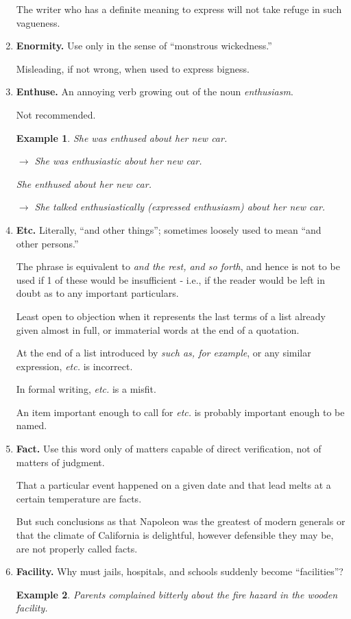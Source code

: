 \documentclass{article}
\newtheorem{example}{Example}
\begin{document}
\begin{enumerate}
	The writer who has a definite meaning to express will not take refuge in such vagueness.
	\item {\bf Enormity.} Use only in the sense of ``monstrous wickedness.''
	
	Misleading, if not wrong, when used to express bigness.
	\item {\bf Enthuse.} An annoying verb growing out of the noun {\it enthusiasm}.
	
	Not recommended.
	\begin{example}
		She was enthused about her new car.
		
		$\to$ She was enthusiastic about her new car.
		
		She enthused about her new car.
		
		$\to$ She talked enthusiastically (expressed enthusiasm) about her new car.
	\end{example}
	\item {\bf Etc.} Literally, ``and other things''; sometimes loosely used to mean ``and other persons.''
	
	The phrase is equivalent to {\it and the rest, and so forth}, and hence is not to be used if 1 of these would be insufficient - i.e., if the reader would be left in doubt as to any important particulars.
	
	Least open to objection when it represents the last terms of a list already given almost in full, or immaterial words at the end of a quotation.
	
	At the end of a list introduced by {\it such as, for example}, or any similar expression, {\it etc.} is incorrect.
	
	In formal writing, {\it etc.} is a misfit.
	
	An item important enough to call for {\it etc.} is probably important enough to be named.
	\item {\bf Fact.} Use this word only of matters capable of direct verification, not of matters of judgment.
	
	That a particular event happened on a given date and that lead melts at a certain temperature are facts.
	
	But such conclusions as that Napoleon was the greatest of modern generals or that the climate of California is delightful, however defensible they may be, are not properly called facts.
	\item {\bf Facility.} Why must jails, hospitals, and schools suddenly become ``facilities''?
	\begin{example}
		Parents complained bitterly about the fire hazard in the wooden facility.
		

\end{example}
\end{enumerate}
\end{document}
